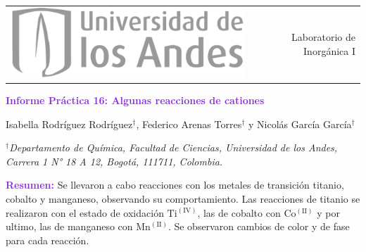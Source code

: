 \documentclass[11pt,fleqn]{article} %
\begin{document}
	\onehalfspacing %
	\setlength{\parskip}{0cm} %
	\setlength{\parindent}{0cm} %
	
	\begin{small}
		\begin{tabularx}{\textwidth}{Y r}
			& \\
			& \large Laboratorio de Inorgánica I \\
			& 
		\end{tabularx}
	\end{small}
	
	\begin{flushleft}
		\textcolor{BlueViolet}{\Large \textbf{Informe Práctica 16: Algunas reacciones de cationes}}
	\end{flushleft}

	Isabella Rodríguez Rodríguez$^{\dag}$, Federico Arenas Torres$^{\dag}$ y Nicolás García García$^{\dag}$
	
	\begin{small}
		\textit{$^{\dag}$Departamento de Química, Facultad de Ciencias, Universidad de los Andes, Carrera 1 N° 18 A 12, Bogotá, 111711, Colombia.}
		
		\textcolor{BlueViolet} {\hrulefill}
		
		\textcolor{BlueViolet} {\textbf{Resumen:}}  Se llevaron a cabo reacciones con los metales de transición titanio, cobalto y manganeso, observando su comportamiento. Las reacciones de titanio se realizaron con el estado de oxidación $\mathrm{Ti^{(IV)}}$, las de cobalto con $\mathrm{Co^{(II)}}$ y por ultimo, las de manganeso con $\mathrm{Mn^{(II)}}$. Se observaron cambios de color y de fase para cada reacción.  
		
		\textcolor{BlueViolet} {\hrulefill} %
	\end{small}
	
	\setlength{\columnsep}{0.63cm} %
	
\end{document}
